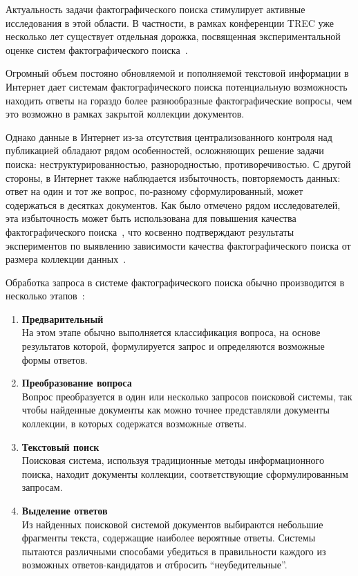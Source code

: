 \documentclass{article}
\begin{document}
Актуальность задачи фактографического поиска стимулирует активные
исследования в этой области. В частности, в рамках конференции TREC 
уже несколько лет существует отдельная дорожка, посвященная 
экспериментальной оценке систем фактографического поиска~\cite{qa:TREC8:evaluation}.

Огромный объем постояно обновляемой и пополняемой текстовой 
информации в Интернет дает системам фактографического поиска
потенциальную возможность находить ответы на гораздо более разнообразные
фактографические вопросы, чем это возможно в рамках закрытой 
коллекции документов. 

Однако данные в Интернет из-за отсутствия централизованного
контроля над публикацией обладают рядом особенностей, осложняющих решение
задачи поиска: неструктурированностью, разнородностью, противоречивостью.
С другой стороны, 
в Интернет также наблюдается избыточность, повторяемость данных:
ответ на один и тот же вопрос, по-разному сформулированный, может содержаться
в десятках документов. Как было отмечено рядом исследователей, 
эта избыточность может быть использована
для повышения качества фактографического
поиска~\cite{qa:dumais:redundancy,qa:clarke:redundancy}, 
что косвенно подтверждают результаты 
экспериментов по выявлению зависимости качества фактографического 
поиска от размера коллекции данных~\cite{qa:clarke:corpus_size_impact,qa:clarke:web_reinforced}.

Обработка запроса в системе фактографического поиска
обычно производится в несколько этапов~\cite{qa:Mulder}:
\begin{enumerate}
\item {\bf Предварительный} \\
На этом этапе обычно выполняется
классификация вопроса, на основе результатов
которой, формулируется запрос и определяются возможные формы ответов.

\item {\bf Преобразование вопроса} \\
Вопрос преобразуется в один или несколько запросов поисковой системы,
так чтобы найденные документы как можно точнее представляли
документы коллекции, в которых содержатся возможные ответы.

\item {\bf Текстовый поиск} \\
Поисковая система, используя традиционные методы информационного поиска,
находит документы коллекции, соответствующие сформулированным запросам.

\item {\bf Выделение ответов} \\
Из найденных поисковой системой документов выбираются
небольшие фрагменты текста, содержащие наиболее вероятные ответы.
Системы пытаются различными способами убедиться в правильности каждого из возможных
ответов-кандидатов и отбросить ``неубедительные''.
\end{enumerate}
\end{document}
